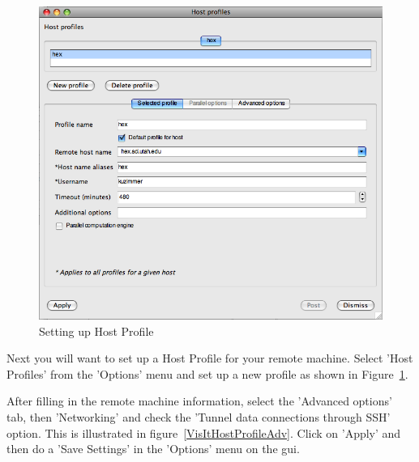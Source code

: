 \documentclass[12pt]{article}
\begin{document}
\begin{figure}

   \vspace{-10pt}
  \begin{center}
    \includegraphics[width=.425\textwidth]{VisItHostProfile.png}
  \end{center}
   \vspace{-10pt}
  \caption{Setting up Host Profile}
   \vspace{-20pt}
  \label{VisItHostProfile}

\end{figure}

Next you will want to set up a Host Profile for your remote
machine. Select 'Host Profiles' from the 'Options' menu and set up a
new profile as shown in Figure~\ref{VisItHostProfile}.








After filling in the remote machine information, select the 'Advanced
options' tab, then 'Networking' and check the 'Tunnel data connections
through SSH' option. This is illustrated in
figure~\ref{VisItHostProfileAdv}. Click on 'Apply' and then do a 'Save
Settings' in the 'Options' menu on the gui.
\end{document}
